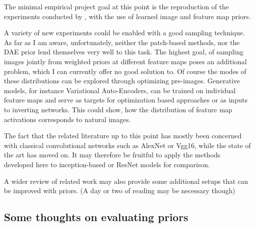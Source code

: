 \documentclass{article}
\begin{document}
The minimal empirical project goal at this point is the reproduction of the experiments conducted by \cite{mv16}, with the use of learned image and feature map priors.

A variety of new experiments could be enabled with a good sampling technique. As far as I am aware, unfortunately, neither the patch-based methods, nor the DAE prior lend themselves very well to this task. The highest goal, of sampling images jointly from weighted priors at different feature maps poses an additional problem, which I can currently offer no good solution to. Of course the modes of these distributions can be explored through optimizing pre-images. 
Generative models, for instance Variational Auto-Encoders, can be trained on individual feature maps and serve as targets for optimization based approaches or as inputs to inverting networks. This could show, how the distribution of feature map activations corresponds to natural images.

The fact that the related literature up to this point has mostly been concerned with classical convolutional networks such as AlexNet or Vgg16, while the state of the art has moved on. It may therefore be fruitful to apply the methods developed here to inception-based or ResNet models for comparison.

A wider review of related work may also provide some additional setups that can be improved with priors. (A day or two of reading may be necessary though) 

\subsection{Some thoughts on evaluating priors}
\end{document}
